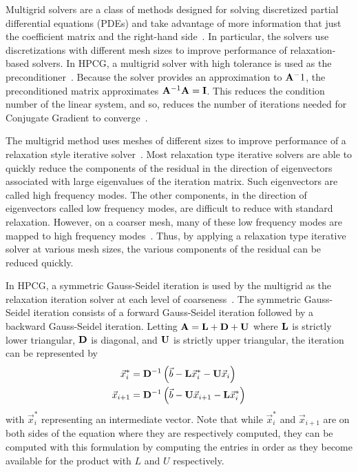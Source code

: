 Multigrid solvers are a class of methods designed for solving discretized partial differential equations (PDEs) and take advantage of more information that just the coefficient matrix and the right-hand side~\cite{Saad:2003:IterativeMethods}.
In particular, the solvers use discretizations with different mesh sizes to improve performance of relaxation-based solvers.
In HPCG, a multigrid solver with high tolerance is used as the preconditioner~\cite{Dongarra:2015:HPCG}.
Because the solver provides an approximation to \(\mathbf{A}^-1\), the preconditioned matrix approximates \(\mathbf{A}^{-1}\mathbf{A} = \mathbf{I}\).
This reduces the condition number of the linear system, and so, reduces the number of iterations needed for Conjugate Gradient to converge~\cite{Saad:2003:IterativeMethods}.

The multigrid method uses meshes of different sizes to improve performance of a relaxation style iterative solver~\cite{Saad:2003:IterativeMethods}.
Most relaxation type iterative solvers are able to quickly reduce the components of the residual in the direction of eigenvectors associated with large eigenvalues of the iteration matrix.
Such eigenvectors are called high frequency modes.
The other components, in the direction of eigenvectors called low frequency modes, are difficult to reduce with standard relaxation.
However, on a coarser mesh, many of these low frequency modes are mapped to high frequency modes~\cite{Saad:2003:IterativeMethods}.
Thus, by applying a relaxation type iterative solver at various mesh sizes, the various components of the residual can be reduced quickly.

In HPCG, a symmetric Gauss-Seidel iteration is used by the multigrid as the relaxation iteration solver at each level of coarseness~\cite{Dongarra:2015:HPCG}.
The symmetric Gauss-Seidel iteration consists of a forward Gauss-Seidel iteration followed by a backward Gauss-Seidel iteration.
Letting \(\mathbf{A} = \mathbf{L}+\mathbf{D}+\mathbf{U}\) where \(\mathbf{L}\) is strictly lower triangular, \(\mathbf{D}\) is diagonal, and \(\mathbf{U}\) is strictly upper triangular, the iteration can be represented by
\begin{align*}
	\vec{x}^*_i   &= \mathbf{D}^{-1}\left(\vec{b} - \mathbf{L}\vec{x}^*_i - \mathbf{U}\vec{x}_i\right) \\
	\vec{x}_{i+1} &= \mathbf{D}^{-1}\left(\vec{b} - \mathbf{U}\vec{x}_{i+1} - \mathbf{L}\vec{x}^*_i\right)
\end{align*}
with \(\vec{x}_i^*\) representing an intermediate vector.
Note that while \(\vec{x}^*_i\) and \(\vec{x}_{i+1}\) are on both sides of the equation where they are respectively computed, they can be computed with this formulation by computing the entries in order as they become available for the product with \(L\) and \(U\) respectively.
